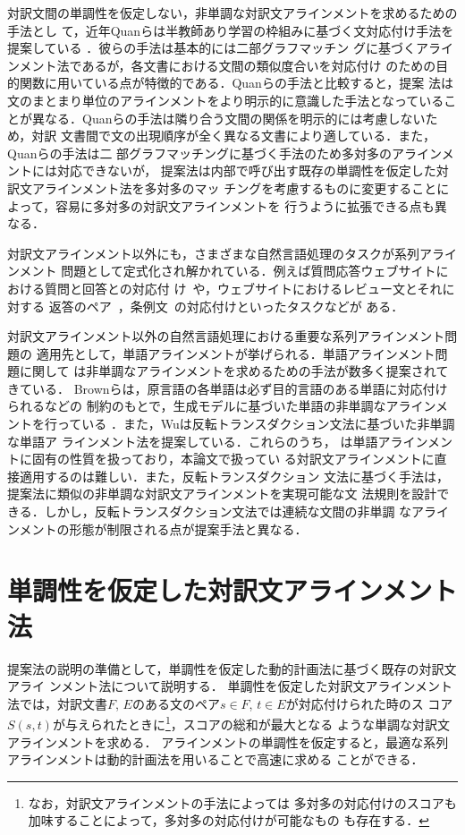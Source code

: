 \documentclass[japanese]{jnlp_1.4}
\begin{document}
対訳文間の単調性を仮定しない，非単調な対訳文アラインメントを求めるための手法とし
て，近年Quanらは半教師あり学習の枠組みに基づく文対応付け手法を提案している
\cite{quan-kit-song:2013:ACL2013}．彼らの手法は基本的には二部グラフマッチン
グに基づくアラインメント法であるが，各文書における文間の類似度合いを対応付け
のための目的関数に用いている点が特徴的である．Quanらの手法と比較すると，提案
法は文のまとまり単位のアラインメントをより明示的に意識した手法となっているこ
とが異なる．Quanらの手法は隣り合う文間の関係を明示的には考慮しないため，対訳
文書間で文の出現順序が全く異なる文書により適している．また，Quanらの手法は二
部グラフマッチングに基づく手法のため多対多のアラインメントには対応できないが，
提案法は内部で呼び出す既存の単調性を仮定した対訳文アラインメント法を多対多のマッ
チングを考慮するものに変更することによって，容易に多対多の対訳文アラインメントを
行うように拡張できる点も異なる．

対訳文アラインメント以外にも，さまざまな自然言語処理のタスクが系列アラインメント
問題として定式化され解かれている．例えば質問応答ウェブサイトにおける質問と回答との対応付
け~\cite{qu-liu:2012:ACL2012}や，ウェブサイトにおけるレビュー文とそれに対する
返答のペア~\cite{孝昭15}，条例文~\cite{要一12}の対応付けといったタスクなどが
ある．

対訳文アラインメント以外の自然言語処理における重要な系列アラインメント問題の
適用先として，単語アラインメントが挙げられる．単語アラインメント問題に関して
は非単調なアラインメントを求めるための手法が数多く提案されてきている．
Brownらは，原言語の各単語は必ず目的言語のある単語に対応付けられるなどの
制約のもとで，生成モデルに基づいた単語の非単調なアラインメントを行っている
\cite{brown93}．また，Wuは反転トランスダクション文法に基づいた非単調な単語ア
ラインメント法を提案している\cite{Wu:1997:SIT:972705.972707}．これらのうち，
\cite{brown93}は単語アラインメントに固有の性質を扱っており，本論文で扱ってい
る対訳文アラインメントに直接適用するのは難しい．また，反転トランスダクション
文法に基づく手法は，提案法に類似の非単調な対訳文アラインメントを実現可能な文
法規則を設計できる．しかし，反転トランスダクション文法では連続な文間の非単調
なアラインメントの形態が制限される点が提案手法と異なる．


\section{単調性を仮定した対訳文アラインメント法}
\label{sec:monotone}

提案法の説明の準備として，単調性を仮定した動的計画法に基づく既存の対訳文アライ
ンメント法について説明する．
単調性を仮定した対訳文アラインメント
法では，対訳文書$F$, $E$のある文のペア$s \in F$, $t \in E$が対応付けられた時のス
コア$S(s, t)$が与えられたときに\footnote{なお，対訳文アラインメントの手法によっては
多対多の対応付けのスコアも加味することによって，多対多の対応付けが可能なもの
も存在する．}，スコアの総和が最大となる
ような単調な対訳文アラインメントを求める．
アラインメントの単調性を仮定すると，最適な系列アラインメントは動的計画法を用いることで高速に求める
ことができる．
\end{document}
